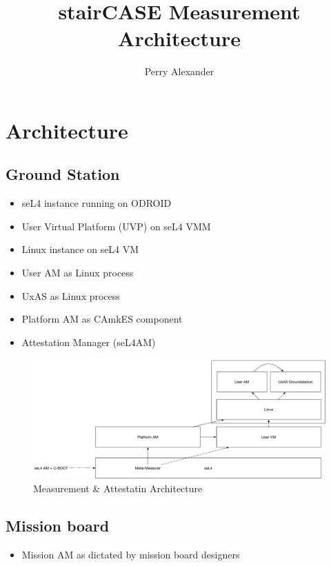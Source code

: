 \documentclass[11pt]{article}
\title{stairCASE Measurement Architecture}
\author{Perry Alexander}
\newcommand{\squash}{\parskip=0pt\itemsep=0pt}
\begin{document}
\maketitle

\section{Architecture}

\subsection{Ground Station}

\begin{itemize}
  \squash
\item seL4 instance running on ODROID
\item User Virtual Platform (UVP) on seL4 VMM
\item Linux instance on seL4 VM
\item User AM as Linux process
\item UxAS as Linux process
\item Platform AM as CAmkES component
\item Attestation Manager (seL4AM)
\end{itemize}

\begin{figure}[hbtp]
  \centering
  \includegraphics[width=\textwidth]{architecture.pdf}
  \caption{Measurement \& Attestatin Architecture}
  \label{fig:architecture}
\end{figure}

\subsection{Mission board}

\begin{itemize}
\item Mission AM as dictated by mission board designers
\end{itemize}
\end{document}
